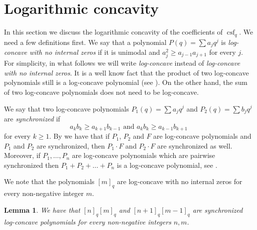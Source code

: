 \documentclass[10pt]{amsart}
\newtheorem{Lem}{Lemma}[section]
\theoremstyle{definition}
\DeclareMathOperator{\csf}{csf}
\begin{document}
\section{Logarithmic concavity}
In this section we discuss the logarithmic concavity of the coefficients of $\csf_q$.  We need a few definitions first. We say that a polynomial $P(q)=\sum a_jq^j$ is \emph{log-concave with no internal zeros} if it is unimodal and $a_j^2\geq a_{j-1}a_{j+1}$ for every $j$. For simplicity, in what follows we will write \emph{log-concave} instead of \emph{log-concave with no internal zeros}. It is a well know fact that the product of two log-concave polynomials still is a log-concave polynomial (see \cite{Stanley86}). On the other hand, the sum of two log-concave polynomials does not need to be log-concave. \par
  We say that two log-concave polynomials $P_1(q)=\sum a_jq^j$ and $P_2(q)=\sum b_jq^j$ are \emph{synchronized} if 
  \begin{equation}
      \label{eq:partialsync}
      a_kb_k\geq a_{k+1}b_{k-1}\text{ and } a_kb_k\geq a_{k-1}b_{k+1}
  \end{equation}
 for every $ k\geq1$.  By \cite{GMTW} we have that if $P_1$, $P_2$ and $F$ are log-concave polynomials and $P_1$ and $P_2$ are synchronized, then $P_1\cdot F$ and $P_2\cdot F$ are synchronized as well. Moreover, if $P_1,\ldots, P_n$ are log-concave polynomials which are pairwise synchronized then $P_1+P_2+\ldots+P_n$ is a log-concave polynomial, see \cite[Theorem 2.13]{GMTW}.\par
  We note that the polynomials $[m]_q$ are log-concave with no internal zeros for every non-negative integer $m$.
\begin{Lem}
\label{lem:nmsync}
  We have that $[n]_q[m]_q$ and $[n+1]_q[m-1]_q$ are synchronized log-concave polynomials for every non-negative integers $n,m$. 
\end{Lem}
\end{document}
